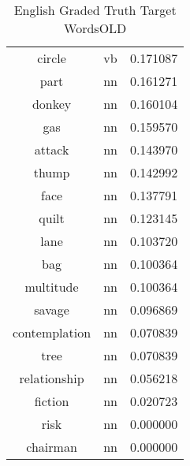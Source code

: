 \begin{table}[h]
\begin{tabular}{ccc}
circle        & vb  & 0.171087         \\
part          & nn  & 0.161271         \\
donkey        & nn  & 0.160104         \\
gas           & nn  & 0.159570         \\
attack        & nn  & 0.143970         \\
thump         & nn  & 0.142992         \\
face          & nn  & 0.137791         \\
quilt         & nn  & 0.123145         \\
lane          & nn  & 0.103720         \\
bag           & nn  & 0.100364         \\
multitude     & nn  & 0.100364         \\
savage        & nn  & 0.096869         \\
contemplation & nn  & 0.070839         \\
tree          & nn  & 0.070839         \\
relationship  & nn  & 0.056218         \\
fiction       & nn  & 0.020723         \\
risk          & nn  & 0.000000         \\
chairman      & nn  & 0.000000         \\
\bottomrule
\end{tabular}
\caption{English Graded Truth Target WordsOLD}
\label{tab:eng-truthtargetsOLD}
\end{table}



